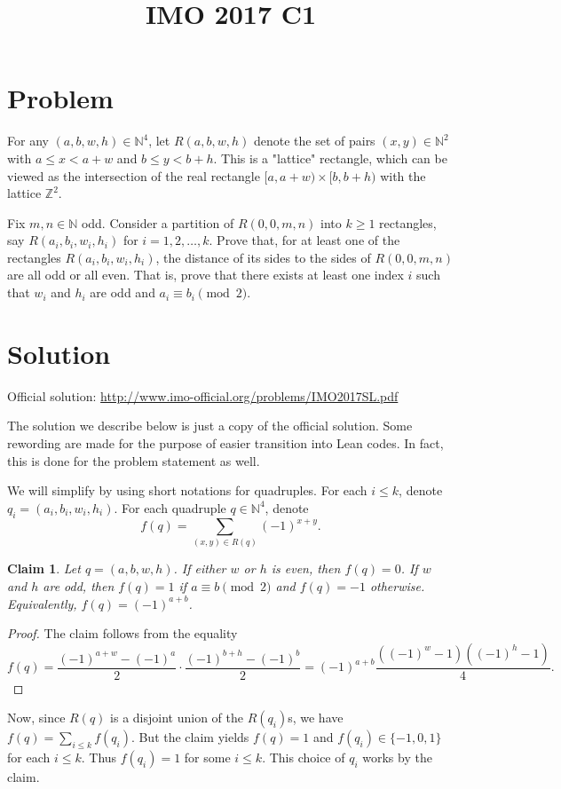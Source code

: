 \documentclass{article}
\title{IMO 2017 C1}
\author{}
\date{}
\newcommand{\N}{\mathbb{N}}
\newcommand{\Z}{\mathbb{Z}}
\newtheorem*{claim}{Claim}
\begin{document}
\maketitle



\section*{Problem}

For any $(a, b, w, h) \in \N^4$, let $R(a, b, w, h)$ denote the set of pairs $(x, y) \in \N^2$ with $a \leq x < a + w$ and $b \leq y < b + h$.
This is a "lattice" rectangle, which can be viewed as the intersection of the real rectangle $[a, a + w) \times [b, b + h)$ with the lattice $\Z^2$.

Fix $m, n \in \N$ odd.
Consider a partition of $R(0, 0, m, n)$ into $k \geq 1$ rectangles, say $R(a_i, b_i, w_i, h_i)$ for $i = 1, 2, \ldots, k$.
Prove that, for at least one of the rectangles $R(a_i, b_i, w_i, h_i)$, the distance of its sides to the sides of $R(0, 0, m, n)$ are all odd or all even.
That is, prove that there exists at least one index $i$ such that $w_i$ and $h_i$ are odd and $a_i \equiv b_i \pmod{2}$.



\section*{Solution}

Official solution: \url{http://www.imo-official.org/problems/IMO2017SL.pdf}

The solution we describe below is just a copy of the official solution.
Some rewording are made for the purpose of easier transition into Lean codes.
In fact, this is done for the problem statement as well.

We will simplify by using short notations for quadruples.
For each $i \leq k$, denote $q_i = (a_i, b_i, w_i, h_i)$.
For each quadruple $q \in \N^4$, denote
\[ f(q) = \sum_{(x, y) \in R(q)} (-1)^{x + y}. \]

\begin{claim}
Let $q = (a, b, w, h)$.
If either $w$ or $h$ is even, then $f(q) = 0$.
If $w$ and $h$ are odd, then $f(q) = 1$ if $a \equiv b \pmod{2}$ and $f(q) = -1$ otherwise.
Equivalently, $f(q) = (-1)^{a + b}$.
\end{claim}
\begin{proof}
The claim follows from the equality
\[ f(q) = \frac{(-1)^{a + w} - (-1)^a}{2} \cdot \frac{(-1)^{b + h} - (-1)^b}{2} = (-1)^{a + b}\frac{((-1)^w - 1)((-1)^h - 1)}{4}. \]
\end{proof}

Now, since $R(q)$ is a disjoint union of the $R(q_i)$s, we have $f(q) = \sum_{i \leq k} f(q_i)$.
But the claim yields $f(q) = 1$ and $f(q_i) \in \{-1, 0, 1\}$ for each $i \leq k$.
Thus $f(q_i) = 1$ for some $i \leq k$.
This choice of $q_i$ works by the claim.
\end{document}
